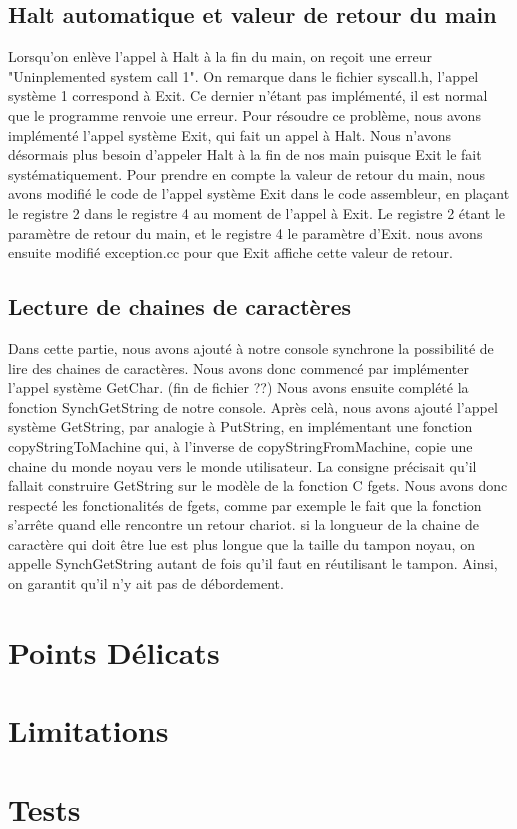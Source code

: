 \documentclass[12pt]{article}
\begin{document}
\subsection{Halt automatique et valeur de retour du main}
Lorsqu'on enlève l'appel à \textcolor{blue2}{Halt} à la fin du main, on reçoit une erreur "Uninplemented system call 1". On remarque dans le fichier \textcolor{vert2}{syscall.h}, l'appel système 1 correspond à \textcolor{blue2}{Exit}. Ce dernier n'étant pas implémenté, il est normal que le programme renvoie une erreur. Pour résoudre ce problème, nous avons implémenté l'appel système \textcolor{blue2}{Exit}, qui fait un appel à \textcolor{blue2}{Halt}. Nous n'avons désormais plus besoin d'appeler \textcolor{blue2}{Halt} à la fin de nos main puisque \textcolor{blue2}{Exit} le fait systématiquement.
\newline
Pour prendre en compte la valeur de retour du main, nous avons modifié le code de l'appel système \textcolor{blue2}{Exit} dans le code assembleur, en plaçant le registre 2 dans le registre 4 au moment de l'appel à \textcolor{blue2}{Exit}. Le registre 2 étant le paramètre de retour du main, et le registre 4 le paramètre d'\textcolor{blue2}{Exit}. nous avons ensuite modifié exception.cc pour que \textcolor{blue2}{Exit} affiche cette valeur de retour.
\bigbreak
\subsection{Lecture de chaines de caractères}
Dans cette partie, nous avons ajouté à notre console synchrone la possibilité de lire des chaines de caractères. Nous avons donc commencé par implémenter l'appel système \textcolor{blue2}{GetChar}. (fin de fichier ??) Nous avons ensuite complété la fonction \textcolor{red2}{SynchGetString} de notre console. Après celà, nous avons ajouté l'appel système \textcolor{blue2}{GetString}, par analogie à \textcolor{blue2}{PutString}, en implémentant une fonction \textcolor{red2}{copyStringToMachine} qui, à l'inverse de \textcolor{red2}{copyStringFromMachine}, copie une chaine du monde noyau vers le monde utilisateur.
\newline
La consigne précisait qu'il fallait construire \textcolor{blue2}{GetString} sur le modèle de la fonction C \textcolor{red2}{fgets}. Nous avons donc respecté les fonctionalités de \textcolor{red2}{fgets}, comme par exemple le fait que la fonction s'arrête quand elle rencontre un retour chariot. si la longueur de la chaine de caractère qui doit être lue est plus longue que la taille du tampon noyau, on appelle \textcolor{red2}{SynchGetString} autant de fois qu'il faut en réutilisant le tampon. Ainsi, on garantit qu'il n'y ait pas de débordement.



\section {Points Délicats}


\section {Limitations}


\section {Tests}
\end{document}
